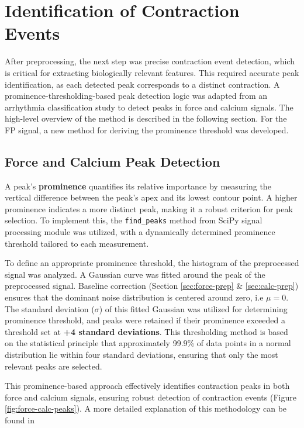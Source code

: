 \documentclass{report}
\begin{document}
\begin{figure}[H]
             \end{figure}

            
    
    \section{Identification of Contraction Events}
    \label{contraction-events}
     After preprocessing, the next step was precise contraction event detection, which is critical for extracting biologically relevant features. This required accurate peak identification, as each detected peak corresponds to a distinct contraction. A prominence-thresholding-based peak detection logic was adapted from an arrhythmia classification study \cite{Sarwar2024} to detect peaks in force and calcium signals. The high-level overview of the method is described in the following section. For the FP signal, a new method for deriving the prominence threshold was developed.

     \subsection{Force and Calcium Peak Detection}
     A peak’s \textbf{prominence} quantifies its relative importance by measuring the vertical difference between the peak's apex and its lowest contour point. A higher prominence indicates a more distinct peak, making it a robust criterion for peak selection. To implement this, the \texttt{find\_peaks}\cite{SciPyFindPeaks} method from SciPy signal processing module was utilized, with a dynamically determined prominence threshold tailored to each measurement.

    To define an appropriate prominence threshold, the histogram of the preprocessed signal was analyzed. A Gaussian curve was fitted around the peak of the preprocessed signal. Baseline correction (Section \ref{sec:force-prep} \& \ref{sec:calc-prep}) ensures that the dominant noise distribution is centered around zero, i.e $\mu=0$. The standard deviation ($\sigma$) of this fitted Gaussian was utilized for determining prominence threshold, and peaks were retained if their prominence exceeded a threshold set at \textbf{+4 standard deviations}. This thresholding method is based on the statistical principle that approximately 99.9\% of data points in a normal distribution lie within four standard deviations, ensuring that only the most relevant peaks are selected.
    
    This prominence-based approach effectively identifies contraction peaks in both force and calcium signals, ensuring robust detection of contraction events (Figure \ref{fig:force-calc-peaks}). A more detailed explanation of this methodology can be found in \cite[Section 4.1]{Sarwar2024}
\end{document}
